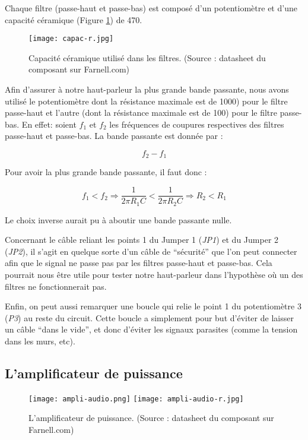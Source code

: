 Chaque filtre (passe-haut et passe-bas) est composé d'un potentiomètre et d'une capacité céramique
(Figure \ref{capac-r}) de \unit{470}{\nano\farad}.

\begin{figure}[!htb]
	\centering
	\texttt{[image: capac-r.jpg]}
	\caption{Capacité céramique utilisé dans les filtres. (Source : datasheet du composant sur Farnell.com)}
	\label{capac-r}
\end{figure}

Afin d'assurer à notre haut-parleur la plus grande bande passante, nous avons utilisé le potentiomètre
dont la résistance maximale est de \unit{1000}{\ohm}) pour le filtre passe-haut et
l'autre (dont la résistance maximale est de \unit{100}{\ohm}) pour le filtre passe-bas. En effet: soient
$f_1$ et $f_2$ les fréquences de coupures respectives des filtres passe-haut et passe-bas. La bande passante
est donnée par :

$$f_2 - f_1$$

Pour avoir la plus grande bande passante, il faut donc :

$$f_1 < f_2 \Rightarrow \frac{1}{2\pi R_1C} < \frac{1}{2\pi R_2C} \Rightarrow R_2 < R_1$$

Le choix inverse aurait pu à aboutir une bande passante nulle.

Concernant le câble reliant les points 1 du Jumper 1 (\textit{JP1}) et du Jumper 2 (\textit{JP2}), 
il s'agit en quelque sorte d'un câble de "`sécurité"' que l'on peut connecter afin que le signal 
ne passe pas par les filtres passe-haut et passe-bas. 
Cela pourrait nous être utile pour tester notre haut-parleur dans l'hypothèse où un des filtres 
ne fonctionnerait pas.

Enfin, on peut aussi remarquer une boucle qui relie le point 1 du potentiomètre 3 (\textit{P3})
au reste du circuit. Cette boucle a simplement pour but d'éviter de laisser un câble "`dans le vide"',
et donc d'éviter les signaux parasites (comme la tension dans les murs, etc).

\subsection{L'amplificateur de puissance}

\begin{figure}[!htb]
	\centering
	\texttt{[image: ampli-audio.png]}
	\texttt{[image: ampli-audio-r.jpg]}
	\caption{L'amplificateur de puissance. (Source : datasheet du composant sur Farnell.com)}
	\label{ampli-audio}
\end{figure}

